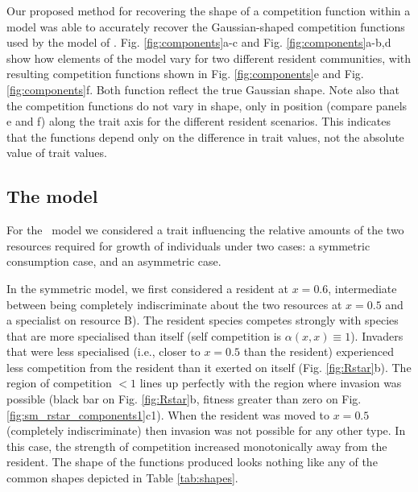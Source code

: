 \documentclass[a4paper,11pt]{article}
\newcommand{\todo}[1]{{\color{navy}{(todo: #1)}}}
\begin{document}
Our proposed method for recovering the shape of a competition function within a model was able to accurately recover the Gaussian-shaped competition functions used by the model of \citet{Dieckmann-1999}. Fig. \ref{fig:components}a-c and Fig. \ref{fig:components}a-b,d show how elements of the model vary for two different resident communities, with resulting competition functions shown in Fig. \ref{fig:components}e and Fig. \ref{fig:components}f. Both function reflect the true Gaussian shape. Note also that the competition functions do not vary in shape, only in position (compare panels e and f) along the trait axis for the different resident scenarios. This indicates that the functions depend only on the difference in trait values, not the absolute value of trait values. \todo{We also found that the shape of the function did not depend on the density of the competitor (add fig in supp mat), which again reflects the true behaviour of the model.}

\subsection{The \Rstar model}


For the \Rstar\ model we considered a trait influencing the relative amounts of the two resources required for growth of individuals under two cases: a symmetric consumption case, and an asymmetric case.

In the symmetric model, we first considered a resident at $x = 0.6$, intermediate between being completely indiscriminate about the two resources at $x = 0.5$ and a specialist on resource B). The resident species competes strongly with species that are more specialised than itself (self competition is $\alpha(x, x) \equiv 1$). Invaders that were less specialised (i.e., closer to $x = 0.5$ than the resident) experienced less competition from the resident than it exerted on itself (Fig. \ref{fig:Rstar}b). The region of competition $< 1$ lines up perfectly with the region where invasion was possible (black bar on Fig. \ref{fig:Rstar}b, fitness greater than zero on Fig. \ref{fig:sm_rstar_components1}c1). When the resident was moved to $x = 0.5$ (completely indiscriminate) then invasion was not possible for any other type.  In this case, the strength of competition increased monotonically away from the resident. The shape of the functions produced looks nothing like any of the common shapes depicted in Table \ref{tab:shapes}.
\end{document}
